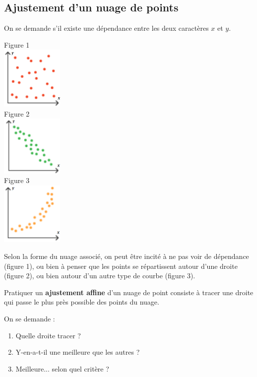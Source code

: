 \documentclass[a4paper,11pt,cours]{nsi} %
\begin{document}
\subsection*{Ajustement d'un nuage de points}
On se demande s'il existe une dépendance entre les deux caractères $x$ et $y$.
\begin{multicols}{3}
    Figure 1\\
    \includegraphics[width=3cm]{Figure3.png}\\
    Figure 2\\
    \includegraphics[width=3cm]{Figure1.png}\\
    Figure 3\\
    \includegraphics[width=3cm]{Figure2.png}
\end{multicols}

Selon la forme du nuage associé, on peut être incité à ne pas voir de dépendance (figure 1), ou bien à penser que les points se répartissent autour d'une droite (figure 2), ou bien autour d'un autre type de courbe (figure 3).

\begin{definition}[]
    Pratiquer un \textbf{ajustement affine} d'un nuage de point consiste à tracer une droite qui passe le plus près possible des points du nuage.\\
\end{definition}

On se demande :
\begin{enumerate}[label=\textbullet]
    \item Quelle droite tracer ?
    \item Y-en-a-t-il une meilleure que les autres ?
    \item Meilleure... selon quel critère ?
\end{enumerate}
\end{document}
